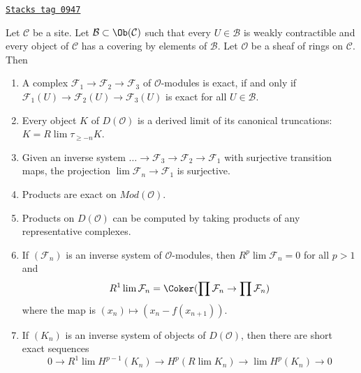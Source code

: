 \begin{proposition}
\label{sites-cohomology-proposition-enough-weakly-contractibles}
\href{https://stacks.math.columbia.edu/tag/0947}{\texttt{Stacks tag 0947}}

Let $\mathcal{C}$ be a site. Let $\mathcal{B} \subset \Ob(\mathcal{C})$
such that every $U \in \mathcal{B}$ is weakly contractible and
every object of $\mathcal{C}$ has a covering by elements of $\mathcal{B}$.
Let $\mathcal{O}$ be a sheaf of rings on $\mathcal{C}$. Then
\begin{enumerate}
\item A complex $\mathcal{F}_1 \to \mathcal{F}_2 \to \mathcal{F}_3$
of $\mathcal{O}$-modules is exact, if and only if
$\mathcal{F}_1(U) \to \mathcal{F}_2(U) \to \mathcal{F}_3(U)$
is exact for all $U \in \mathcal{B}$.
\item Every object $K$ of $D(\mathcal{O})$ is a derived limit
of its canonical truncations: $K = R\lim \tau_{\geq -n} K$.
\item Given an inverse system
$\ldots \to \mathcal{F}_3 \to \mathcal{F}_2 \to \mathcal{F}_1$
with surjective transition maps, the projection
$\lim \mathcal{F}_n \to \mathcal{F}_1$ is surjective.
\item Products are exact on $\textit{Mod}(\mathcal{O})$.
\item Products on $D(\mathcal{O})$ can be computed by taking
products of any representative complexes.
\item If $(\mathcal{F}_n)$ is an inverse system of $\mathcal{O}$-modules,
then $R^p\lim \mathcal{F}_n = 0$ for all $p > 1$ and
$$
R^1\lim \mathcal{F}_n  =
\Coker(\prod \mathcal{F}_n \to \prod \mathcal{F}_n)
$$
where the map is $(x_n) \mapsto (x_n - f(x_{n + 1}))$.
\item If $(K_n)$ is an inverse system of objects of $D(\mathcal{O})$,
then there are short exact sequences
$$
0 \to R^1\lim H^{p - 1}(K_n) \to H^p(R\lim K_n) \to
\lim H^p(K_n) \to 0
$$
\end{enumerate}
\end{proposition}

